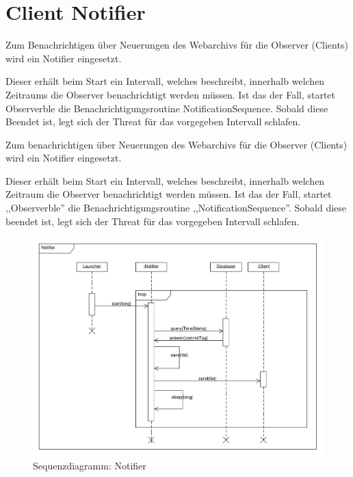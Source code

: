 \section {Client Notifier}
\liable{\sab}
Zum Benachrichtigen über Neuerungen des Webarchivs für die Observer (Clients) wird ein Notifier eingesetzt.

Dieser erhält beim Start ein Intervall, welches beschreibt, 
innerhalb welchen Zeitraums die Observer  benachrichtigt werden müssen. 
Ist das der Fall, startet Observerble die Benachrichtigungsroutine NotificationSequence. 
Sobald diese Beendet ist, legt sich der Threat  für das vorgegeben Intervall schlafen.

Zum benachrichtigen über Neuerungen des Webarchivs für die Observer (Clients) wird ein Notifier eingesetzt.

Dieser erhält beim Start ein Intervall, welches beschreibt, innerhalb welchen Zeitraum die Observer  benachrichtigt werden müssen. 
Ist das der Fall, startet ,,Observerble'' die Benachrichtigungsroutine  ,,NotificationSequence''.
Sobald diese beendet ist, legt sich der Threat  für das vorgegeben Intervall schlafen.

\begin{figure}[H]
	\centering
	\label{dia:design:frontend:sqc:notifier}
	\includegraphics[width=\textwidth]{design/frontend/sequence/notifySequence.pdf}
	\caption{Sequenzdiagramm: Notifier}
\end{figure}

